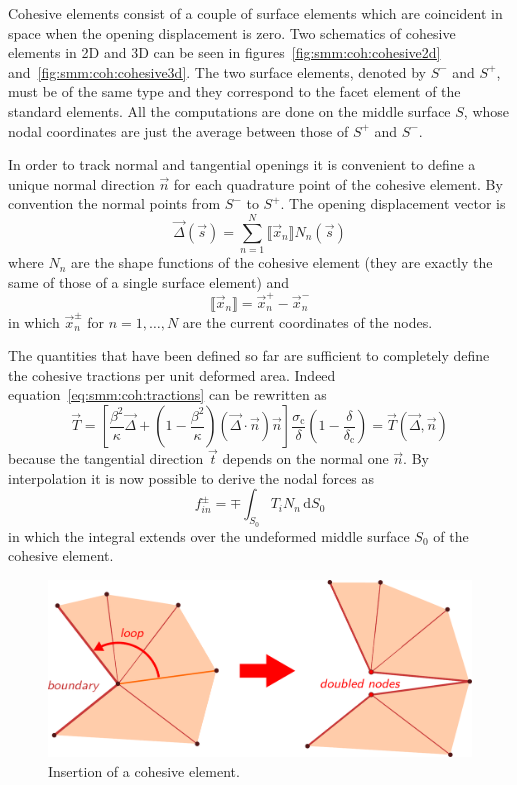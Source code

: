 Cohesive elements consist of a couple of surface elements which are
coincident in space when the opening displacement is zero. Two
schematics of cohesive elements in 2D and 3D can be seen in
figures~\ref{fig:smm:coh:cohesive2d}
and~\ref{fig:smm:coh:cohesive3d}. The two surface elements, denoted by
$S^-$ and $S^+$, must be of the same type and they correspond to the
facet element of the standard elements. All the computations are done
on the middle surface $S$, whose nodal coordinates are just the
average between those of $S^+$ and $S^-$.

In order to track normal and tangential openings it is convenient to
define a unique normal direction $\vec{n}$ for each quadrature point
of the cohesive element. By convention the normal points from $S^-$ to
$S^+$. The opening displacement vector is
\begin{equation}
  \label{eq:opening_displacement}
  \vec{\Delta} (\vec{s}) = \sum_{n=1}^N \llbracket \vec{x}_n \rrbracket N_n (\vec s)
\end{equation}
where $N_n$ are the shape functions of the cohesive element (they are
exactly the same of those of a single surface element) and
\begin{equation}
  \label{eq:disp_difference}
  \llbracket \vec{x}_n \rrbracket = \vec{x}_n^+ - \vec{x}_n^-
\end{equation}
in which $\vec{x}_n^\pm$ for $n=1,\dots,N$ are the current coordinates
of the nodes.

The quantities that have been defined so far are sufficient to
completely define the cohesive tractions per unit deformed
area. Indeed equation~\eqref{eq:smm:coh:tractions} can be rewritten as
\begin{equation}
  \vec{T} = \left[ \frac{\beta^2}{\kappa} \vec{\Delta} +
    \left( 1- \frac{\beta^2}{\kappa}\right)
    \left( \vec{\Delta} \cdot \vec{n}\right) \vec{n} \right]
  \frac{\sigma_\mathrm{c}}{\delta}
  \left( 1- \frac{\delta}{\delta_\mathrm{c}} \right) =
  \vec{T}(\vec{\Delta}, \vec{n})
\end{equation}
because the tangential direction $\vec{t}$ depends on the normal one
$\vec{n}$. By interpolation it is now possible to derive the nodal
forces as
\begin{equation}
  f_{in}^\pm = \mp \int_{S_0} T_i N_n\, \mathrm{d}S_0
\end{equation}
in which the integral extends over the undeformed middle surface $S_0$
of the cohesive element.

\begin{figure}
  \centering
  \includegraphics[width=.8\textwidth]{figures/insertion}
  \caption{Insertion of a cohesive element.}
  \label{fig:smm:coh:insertion}
\end{figure}

